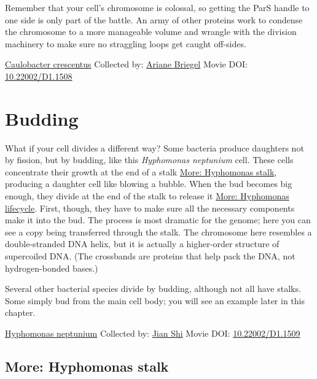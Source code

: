 \documentclass[]{tufte-book}
\begin{document}
Remember that your cell's chromosome is colossal, so getting the ParS handle to one side is only part of the battle. An army of other proteins work to condense the chromosome to a more manageable volume and wrangle with the division machinery to make sure no straggling loops get caught off-sides.



\hypertarget{htmlwidget-50316a0a075f9f9cac11}{}

\label{fig:5-2}\protect\hyperlink{tree}{Caulobacter crescentus} Collected by: \protect\hyperlink{ariane_briegel}{Ariane Briegel} Movie DOI: \href{https://doi.org/10.22002/D1.1508}{10.22002/D1.1508}

\hypertarget{budding}{%
\section{Budding}\label{budding}}

What if your cell divides a different way? Some bacteria produce daughters not by fission, but by budding, like this \emph{Hyphomonas neptunium} cell. These cells concentrate their growth at the end of a stalk \protect\hyperlink{Hyphomonas_stalk}{More: Hyphomonas stalk}, producing a daughter cell like blowing a bubble. When the bud becomes big enough, they divide at the end of the stalk to release it \protect\hyperlink{Hyphomonas_lifecycle}{More: Hyphomonas lifecycle}. First, though, they have to make sure all the necessary components make it into the bud. The process is most dramatic for the genome; here you can see a copy being transferred through the stalk. The chromosome here resembles a double-stranded DNA helix, but it is actually a higher-order structure of supercoiled DNA. (The crossbands are proteins that help pack the DNA, not hydrogen-bonded bases.)

Several other bacterial species divide by budding, although not all have stalks. Some simply bud from the main cell body; you will see an example later in this chapter.



\hypertarget{htmlwidget-4ae16f6af9ec07a660ae}{}

\label{fig:5-3}\protect\hyperlink{tree}{Hyphomonas neptunium} Collected by: \protect\hyperlink{jian_shi}{Jian Shi} Movie DOI: \href{https://doi.org/10.22002/D1.1509}{10.22002/D1.1509}

\hypertarget{Hyphomonas_stalk}{%
\subsection*{More: Hyphomonas stalk}\label{Hyphomonas_stalk}}
\end{document}
